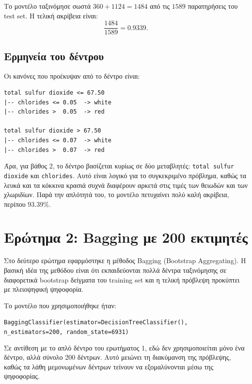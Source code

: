\documentclass[12pt,a4paper]{article}
\newcommand{\code}[1]{\texttt{\textenglish{#1}}}
\begin{document}
Το μοντέλο ταξινόμησε σωστά $360+1124=1484$ από τις $1589$ παρατηρήσεις του
test set. Η τελική ακρίβεια είναι:
\[
    \frac{1484}{1589}=0.9339.
\]

\subsection{Ερμηνεία του δέντρου}

Οι κανόνες που προέκυψαν από το δέντρο είναι:

\begin{verbatim}
total sulfur dioxide <= 67.50
|-- chlorides <= 0.05  -> white
|-- chlorides >  0.05  -> red

total sulfur dioxide > 67.50
|-- chlorides <= 0.07  -> white
|-- chlorides >  0.07  -> red
\end{verbatim}

Άρα, για βάθος 2, το δέντρο βασίζεται κυρίως σε δύο μεταβλητές:
\code{total sulfur dioxide} και \code{chlorides}. Αυτό είναι λογικό για το
συγκεκριμένο πρόβλημα, καθώς τα λευκά και τα κόκκινα κρασιά συχνά διαφέρουν
αρκετά στις τιμές των θειωδών και των χλωριδίων. Παρά την απλότητά του, το
μοντέλο πετυχαίνει πολύ καλή ακρίβεια, περίπου 93.39\%.

\section{Ερώτημα 2: Bagging με 200 εκτιμητές}

Στο δεύτερο ερώτημα εφαρμόστηκε η μέθοδος Bagging
(\textenglish{Bootstrap Aggregating}). Η βασική ιδέα της μεθόδου είναι ότι
εκπαιδεύονται πολλά δέντρα ταξινόμησης σε διαφορετικά bootstrap δείγματα του
training set και η τελική πρόβλεψη προκύπτει με πλειοψηφική ψηφοφορία.

Το μοντέλο που χρησιμοποιήθηκε ήταν:

\begin{center}
\small
\code{BaggingClassifier(estimator=DecisionTreeClassifier(), n\_estimators=200, random\_state=6931)}
\end{center}

Σε αντίθεση με το απλό δέντρο του ερωτήματος 1, εδώ δεν χρησιμοποιείται μόνο
ένα δέντρο, αλλά σύνολο 200 δέντρων. Αυτό μειώνει τη διακύμανση της πρόβλεψης,
καθώς τα λάθη μεμονωμένων δέντρων τείνουν να εξομαλύνονται μέσω της
ψηφοφορίας.
\end{document}
